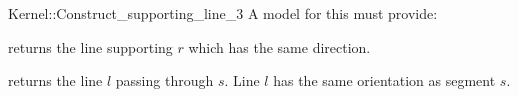 \begin{ccRefFunctionObjectConcept}{Kernel::Construct_supporting_line_3}
A model for this must provide:


       {returns the line supporting $r$ which has the same direction.}

       {returns the line $l$ passing through $s$. Line $l$  has the
        same orientation as segment $s$.}

\ccIsModel{}

\end{ccRefFunctionObjectConcept}
